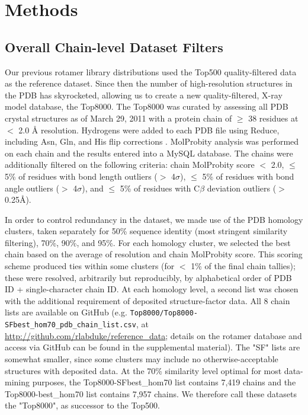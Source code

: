 \section{Methods}
\subsection{\textcolor{changecolor}{Overall} Chain-level Dataset Filters}
Our previous rotamer library distributions \cite{lovell2000penultimate} used the Top500 quality-filtered data \citep{Lovell:2003uq} as the reference dataset. Since then the number of high-resolution structures in the PDB has skyrocketed, allowing us to create a new quality-filtered, X-ray model database, the Top8000. The Top8000 was curated by assessing all PDB crystal structures as of March 29, 2011 with a protein chain of $\ge$ 38 residues at $<$ 2.0 \AA{} resolution. Hydrogens were added to each PDB file using Reduce, including Asn, Gln, and His flip corrections \citep{Word19991735}. MolProbity analysis was performed on each chain \citep{Chen:2010kx} and the results entered into a MySQL database. The chains were additionally filtered on the following criteria: chain MolProbity score $<$ 2.0, $\le$ 5\% of residues with bond length outliers ($>$ 4$\sigma$), $\le$ 5\% of residues with bond angle outliers ($>$ 4$\sigma$), and $\le$ 5\% of residues with C$\beta$ deviation outliers ($>$ 0.25\AA{}).

In order to control redundancy in the dataset, we made use of the PDB homology clusters, taken separately for 50\% sequence identity (most stringent similarity filtering), 70\%, 90\%, and 95\%. For each homology cluster, we selected the best chain based on the average of resolution and chain MolProbity score. This scoring scheme produced ties within some clusters (for $<$ 1\% of the final chain tallies); these were resolved, arbitrarily but reproducibly, by alphabetical order of PDB ID + single-character chain ID. At each homology level, a second list was chosen with the additional requirement of deposited structure-factor data. All 8 chain lists are available on GitHub \citep{Dabbish:2012} (e.g. \texttt{Top8000/Top8000-SFbest\_hom70\_pdb\_chain\_list.csv}, at \url{http://github.com/rlabduke/reference_data}\textcolor{changecolor}{; details on the rotamer database and access via GitHub can
be found in the supplemental material}). The "SF" lists are somewhat smaller, since some clusters may include no otherwise-acceptable structures with deposited data. At the 70\% similarity level optimal for most data-mining purposes, the Top8000-SFbest\_hom70 list contains 7,419 chains and the Top8000-best\_hom70 list contains 7,957 chains. \textcolor{changecolor}{We therefore call these datasets the "Top8000", as successor to the Top500.}

